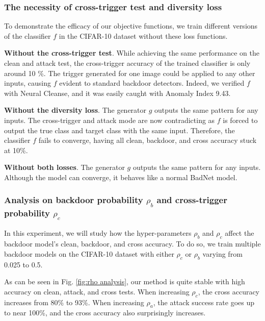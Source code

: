 \subsubsection{The necessity of cross-trigger test and diversity loss}
To demonstrate the efficacy of our objective functions, we train different versions of the classifier $f$ in the CIFAR-10 dataset without these loss functions. 

\textbf{Without the cross-trigger test}. While achieving the same performance on the clean and attack test, the cross-trigger accuracy of the trained classifier is only around 10 \%. The trigger generated for one image could be applied to any other inputs, causing $f$ evident to standard backdoor detectors. Indeed, we verified $f$ with Neural Cleanse, and it was easily caught with Anomaly Index 9.43.
 
\textbf{Without the diversity loss}. The generator $g$ outputs the same pattern for any inputs. The cross-trigger and attack mode are now contradicting as $f$ is forced to output the true class and target class with the same input. Therefore, the classifier $f$ fails to converge, having all clean, backdoor, and cross accuracy stuck at 10\%.

\textbf{Without both losses}. 
The generator $g$ outputs the same pattern for any inputs. Although the model can converge, it behaves like a normal BadNet model.

\subsubsection{Analysis on backdoor probability $\rho_b$ and cross-trigger probability $\rho_c$}

In this experiment, we will study how the hyper-parameters $\rho_b$ and $\rho_c$ affect the backdoor model's clean, backdoor, and cross accuracy. To do so, we train multiple backdoor models on the CIFAR-10 dataset with either $\rho_c$  or $\rho_b$ varying from 0.025 to 0.5.

As can be seen in Fig. \ref{fig:rho analysis}, our method is quite stable with high accuracy on clean, attack, and cross tests. When increasing $\rho_c$, the cross accuracy increases from 80\% to 93\%. When increasing $\rho_a$, the attack success rate goes up to near 100\%, and the cross accuracy also surprisingly increases.

